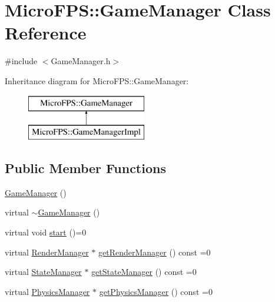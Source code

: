 \hypertarget{class_micro_f_p_s_1_1_game_manager}{
\section{MicroFPS::GameManager Class Reference}
\label{d8/d88/class_micro_f_p_s_1_1_game_manager}
}


{\ttfamily \#include $<$GameManager.h$>$}

Inheritance diagram for MicroFPS::GameManager:\begin{figure}[H]
\begin{center}
\leavevmode
\includegraphics[height=2.000000cm]{d8/d88/class_micro_f_p_s_1_1_game_manager}
\end{center}
\end{figure}
\subsection*{Public Member Functions}
\begin{DoxyCompactItemize}
\item 
\hyperlink{class_micro_f_p_s_1_1_game_manager_ac51554cf7901660c82e9e706121e6711}{GameManager} ()
\item 
virtual \hyperlink{class_micro_f_p_s_1_1_game_manager_aade03d5fb5ef9c9474188fbb9a0a033a}{$\sim$GameManager} ()
\item 
virtual void \hyperlink{class_micro_f_p_s_1_1_game_manager_afce01403245a9266642fb609c3dd18de}{start} ()=0
\item 
virtual \hyperlink{class_micro_f_p_s_1_1_render_manager}{RenderManager} $\ast$ \hyperlink{class_micro_f_p_s_1_1_game_manager_ac8792976d8d44730864afb866f7ce7cc}{getRenderManager} () const =0
\item 
virtual \hyperlink{class_micro_f_p_s_1_1_state_manager}{StateManager} $\ast$ \hyperlink{class_micro_f_p_s_1_1_game_manager_ac8e2bed71b241e8e0463bdeb9175d844}{getStateManager} () const =0
\item 
virtual \hyperlink{class_micro_f_p_s_1_1_physics_manager}{PhysicsManager} $\ast$ \hyperlink{class_micro_f_p_s_1_1_game_manager_a5f7ba66d79351b6a3ce66c818ed73433}{getPhysicsManager} () const =0
\end{DoxyCompactItemize}


